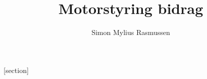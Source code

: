

\title{Motorstyring bidrag}
\author{Simon Mylius Rasmussen}






[section]\setcounter{udrboks}{0}
\renewcommand{\theudrboks}{\arabic{section}.\arabic{udrboks}}
\renewcommand{\theudrboks}{\arabic{udrboks}}
\newenvironment{udrboks}[2][]{%
  \refstepcounter{udrboks}%
  \ifstrempty{#1}%
  {\mdfsetup{%
      frametitle={%
        \tikz[baseline=(current bounding box.east),outer sep=0pt]
        \node[anchor=east,rectangle,fill=blue!20]
        {\strut Udregninger~\theudrboks};}}
  }%
  {\mdfsetup{%
      frametitle={%
        \tikz[baseline=(current bounding box.east),outer sep=0pt]
        \node[anchor=east,rectangle,fill=blue!20]
        {\strut Udregninger ~\theudrboks:~#1};}}%
  }%
  \mdfsetup{innertopmargin=10pt,linecolor=blue!20,%
    linewidth=2pt,topline=true,%
    frametitleaboveskip=\dimexpr-\ht\strutbox\relax
  }
  \begin{mdframed}[]\relax%
    \label{#2}}{\end{mdframed}}


